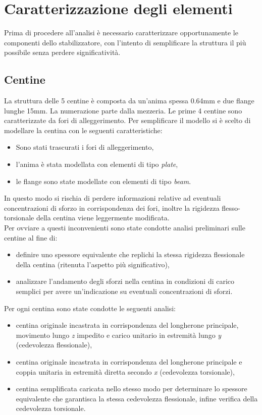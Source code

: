 \documentclass[
10pt, %
a4paper, %
oneside, %
headinclude,footinclude, %
BCOR5mm, %
]{scrartcl}
\begin{document}
\section{Caratterizzazione degli elementi}

Prima di procedere all'analisi è necessario caratterizzare opportunamente le componenti dello stabilizzatore, con l'intento di semplificare la struttura il più possibile senza perdere significatività. 

\subsection{Centine}

La struttura delle 5 centine è composta da un'anima spessa 0.64mm e due flange lunghe 15mm. La numerazione parte dalla mezzeria. Le prime 4 centine sono caratterizzate da fori di alleggerimento.
Per semplificare il modello si è scelto di modellare la centina con le seguenti caratteristiche:

\begin{itemize}
	\item Sono stati trascurati i fori di alleggerimento,
	\item l'anima è stata modellata con elementi di tipo \emph{plate},
	\item le flange sono state modellate con elementi di tipo \emph{beam}.
\end{itemize} 

In questo modo si rischia di perdere informazioni relative ad eventuali concentrazioni di sforzo in corrispondenza dei fori, inoltre la rigidezza flesso-torsionale della centina viene leggermente modificata.\\
Per ovviare a questi inconvenienti sono state condotte analisi preliminari sulle centine al fine di:

\begin{itemize}
	\item definire uno spessore equivalente che replichi la stessa rigidezza flessionale della centina (ritenuta l'aspetto più significativo),
	\item analizzare l'andamento degli sforzi nella centina in condizioni di carico semplici per avere un'indicazione su eventuali concentrazioni di sforzi.
\end{itemize}

Per ogni centina sono state condotte le seguenti analisi:

\begin{itemize}
	\item centina originale incastrata in corrispondenza del longherone principale, movimento lungo \emph{z} impedito e carico unitario in estremità lungo \emph{y} (cedevolezza flessionale),
	\item centina originale incastrata in corrispondenza del longherone principale e coppia unitaria in estremità diretta secondo \emph{x} (cedevolezza torsionale),
	\item centina semplificata caricata nello stesso modo per determinare lo spessore equivalente che garantisca la stessa cedevolezza flessionale, infine verifica della cedevolezza torsionale. 
\end{itemize}
\end{document}
